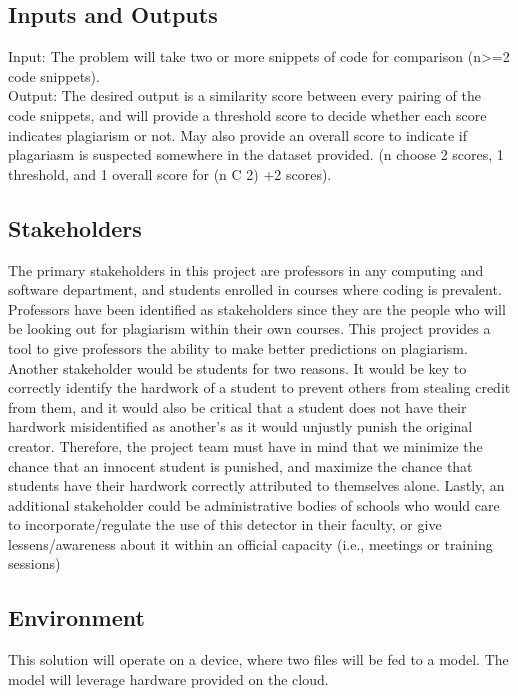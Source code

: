 \documentclass{article}
\begin{document}
\subsection{Inputs and Outputs}
Input: The problem will take two or more snippets of code for comparison (n>=2
code snippets). \\
Output: The desired output is a similarity score between every pairing of the
code snippets, and will provide a threshold score to decide whether each score
indicates plagiarism or not. May also provide an overall score to indicate if
plagariasm is suspected somewhere in the dataset provided. (n choose 2 scores, 1
threshold, and 1 overall score for (n C 2) +2 scores). 


\subsection{Stakeholders}
The primary stakeholders in this project are professors in any computing and
software department, and students enrolled in courses where coding is prevalent.
Professors have been identified as stakeholders since they are the people who
will be looking out for plagiarism within their own courses. This project
provides a tool to give professors the ability to make better predictions on
plagiarism. Another stakeholder would be students for two reasons. It would be
key to correctly identify the hardwork of a student to prevent others from
stealing credit from them, and it would also be critical that a student does not
have their hardwork misidentified as another's as it would unjustly punish the
original creator. Therefore, the project team must have in mind that we minimize
the chance that an innocent student is punished, and maximize the chance that
students have their hardwork correctly attributed to themselves alone. Lastly,
an additional stakeholder could be administrative bodies of schools who would
care to incorporate/regulate the use of this detector in their faculty, or give
lessens/awareness about it within an official capacity (i.e., meetings or
training sessions)

\subsection{Environment}
This solution will operate on a device, where two files will be fed to a model.
The model will leverage hardware provided on the cloud.
\end{document}

